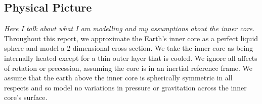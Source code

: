 \documentclass{article}
\begin{document}
\subsection*{Physical Picture}
{\it{Here I talk about what I am modelling and my assumptions about the inner core.}}
\vspace{0.3cm}
\newline
Throughout this report, we approximate the Earth's inner core as a perfect liquid sphere and model a 
2-dimensional cross-section. We take the inner core as being internally heated except for a thin 
outer layer that is cooled. We ignore all affects of rotation or precession, assuming the core is 
in an inertial reference frame. We assume that the earth above the inner core is spherically 
symmetric in all respects and so model no variations in pressure or gravitation across the inner 
core's surface.
\end{document}
